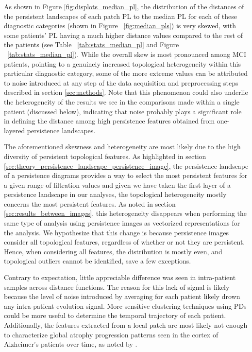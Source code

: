 \documentclass{article}
\begin{document}
As shown in Figure \ref{fig:displots_median_pl}, the distribution of the distances of the persistent
landscapes of each patch PL to the median PL for each of these diagnostic categories (shown in
Figure ~\ref{fig:median_pls}) is very skewed, with some patients' PL having a much higher distance
values compared to the rest of the patients (see Table ~\ref{tab:stats_median_pl} and Figure
~\ref{tab:stats_median_pl}). While the overall skew is most pronounced among MCI patients, pointing
to a genuinely increased topological heterogeneity within this particular diagnostic category, some
of the more extreme values can be attributed to noise introduced at any step of the data acquisition
and preprocessing steps described in section \ref{sec:methods}. Note that this phenomenon could also
underlie the heterogeneity of the results we see in the comparisons made within a single patient
(discussed below), indicating that noise probably plays a significant role in defining the distance
among high persistence features obtained from one-layered persistence landscapes.

The aforementioned skewness and heterogeneity are most likely due to the high diversity of persistent
topological features. As highlighted in section
\ref{sec:theory_persistence_landscape_persistence_image}, the persistence landscape of a persistence
diagrams provides a way to select the most persistent features for a given range of filtration
values and given we have taken the first layer of a persistence landscape in our analyses, the
topological heterogeneity mostly concerns the most persistent features. As noted in section
\ref{sec:results_between_images}, this heterogeneity disappears when performing the same type of
analysis using persistence images as vectorized representations for the analysis. We hypothesize
that this change is because persistence images consider all topological features,
regardless of whether or not they are persistent. Hence, when considering all features, the
distribution is mostly even, and topological outliers cannot be identified, save a few exceptions.

Contrary to expectation, little appreciable difference was seen in intra-patient samples across
distance functions. The reason for this lack of signal is likely because the level of
noise introduced by averaging for each patient likely drown any intra-patient evolution signal. More
sensitive clustering techniques using PDs could be more useful to determine the temporal trajectory
of each patient. Additionally, the features extracted from a local patch are most likely
not enough to characterize global atrophy progression patterns seen in the cortex of Alzheimer's
patients over time, as noted by \citep{toniolo2018patterns}.
\end{document}
